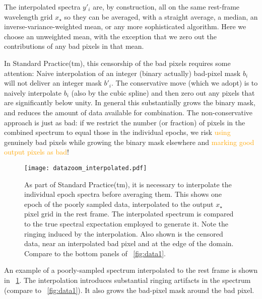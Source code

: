 \documentclass[modern, linenumbers]{aastex631}
\newlength{\figurewidth}
\newcommand{\modified}[1]{\textcolor{orange}{#1}}
\begin{document}
The interpolated spectra $y'_i$ are, by construction, all on the same rest-frame wavelength grid $x_\star$ so they can be averaged, with a straight average, a median, an inverse-variance-weighted mean, or any more sophisticated algorithm.
Here we choose an unweighted mean, with the exception that we zero out the contributions of any bad pixels in that mean.

In Standard Practice(tm), this censorship of the bad pixels requires some attention:
Naive interpolation of an integer (binary actually) bad-pixel mask $b_i$ will not deliver an integer mask $b'_i$.
The conservative move (which we adopt) is to naively interpolate $b_i$ (also by the cubic spline) and then zero out any pixels that are significantly below unity.
In general this substantially grows the binary mask, and reduces the amount of data available for combination.
The non-conservative approach is just as bad: if we restrict the number (or fraction) of pixels in the combined spectrum to equal those in the individual epochs, we risk \modified{using} genuinely bad pixels while growing the binary mask elsewhere and \modified{marking good output pixels as bad}!

\begin{figure}[t!]
    \begin{mdframed}\begin{center}
    \texttt{[image: datazoom\_interpolated.pdf]}
    \end{center}
    \caption{As part of Standard Practice(tm), it is necessary to interpolate the individual epoch spectra before averaging them. This shows one epoch of the poorly sampled data, interpolated to the output $x_\star$ pixel grid in the rest frame. The interpolated spectrum is compared to the true spectral expectation employed to generate it. Note the ringing induced by the interpolation. Also shown is the censored data, near an interpolated bad pixel and at the edge of the domain. Compare to the bottom panels of \figurename~\ref{fig:data1}.\label{fig:interpolated}}
    \end{mdframed}
\end{figure}
An example of a poorly-sampled spectrum interpolated to the rest frame is shown in \figurename~\ref{fig:interpolated}.
The interpolation introduces substantial ringing artifacts in the spectrum (compare to \figurename~\ref{fig:data1}).
It also grows the bad-pixel mask around the bad pixel.
\end{document}
